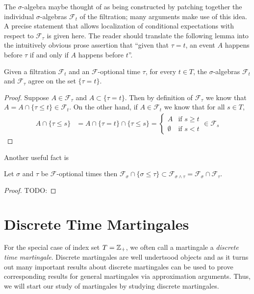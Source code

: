The $\sigma$-algebra maybe thought of as being constructed by patching
together the individual $\sigma$-algebras $\mathcal{F}_t$ of the
filtration; many arguments make use of this idea.  A precise statement
that allows localization of conditional expectations with respect to
$\mathcal{F}_\tau$ is given here.  The reader should translate the
following lemma into the intuitively obvious prose assertion that ``given
that $\tau = t$, an event $A$ happens before
$\tau$ if and only if $A$ happens before $t$''.
\begin{lem}\label{LocalizationOfStoppedFiltration}Given a filtration $\mathcal{F}_t$ and an
  $\mathcal{F}$-optional time $\tau$, for every $t \in T$, the $\sigma$-algebras
  $\mathcal{F}_t$ and $\mathcal{F}_\tau$ agree on the set $\lbrace
  \tau = t\rbrace$.
\end{lem}
\begin{proof}
Suppose $A \in \mathcal{F}_\tau$ and $A \subset \lbrace \tau = t
\rbrace$.  Then by definition of $\mathcal{F}_\tau$ we know that $A = A
\cap \lbrace \tau \leq t \rbrace \in \mathcal{F}_t$.  On the other
hand, if $A \in \mathcal{F}_t$ we know that for all $s \in T$,
\begin{align*}
A \cap \lbrace \tau \leq s \rbrace &= A \cap \lbrace \tau = t
\rbrace \cap\lbrace \tau \leq s \rbrace = \begin{cases}
A & \text{if $s \geq t$} \\
\emptyset & \text{if $s < t$}
\end{cases}
\in \mathcal{F}_s
\end{align*}
\end{proof}

Another useful fact is 
\begin{prop}\label{StoppedAlgebraMinOfOptionalTimes}Let $\sigma$ and $\tau$ be $\mathcal{F}$-optional times
  then $\mathcal{F}_\sigma \cap \lbrace \sigma \leq \tau \rbrace \subset
  \mathcal{F}_{\sigma \wedge \tau} = \mathcal{F}_\sigma \cap \mathcal{F}_\tau$.
\end{prop}
\begin{proof}
TODO:
\end{proof}

\section{Discrete Time Martingales}
For the special case of index set $T = \mathbb{Z}_+$, we often call a
martingale a \emph{discrete time martingale}.  Discrete martingales are well
undertsood objects and as it turns out many important results about discrete
martingales can be used to prove corresponding results for general martingales via approximation
arguments.  Thus, we will start our study of martingales by studying
discrete martingales.

